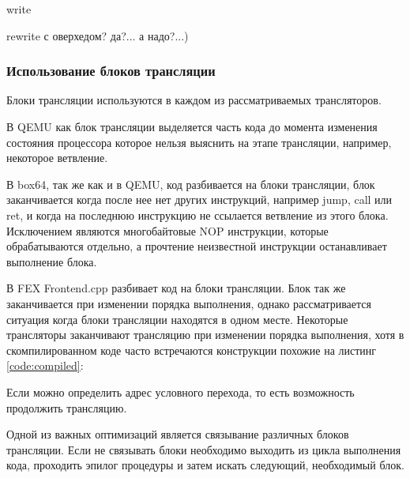write

rewrite с оверхедом? да?... а надо?...)

\subsubsection{Использование блоков трансляции}

Блоки трансляции используются в каждом из рассматриваемых трансляторов.

В QEMU как блок трансляции выделяется часть кода до момента изменения состояния процессора которое нельзя выяснить на этапе трансляции, например, некоторое ветвление. \cite{qemu_docs}

В box64, так же как и в QEMU, код разбивается на блоки трансляции, блок заканчивается когда после нее нет других инструкций, например jump, call или ret, и когда на последнюю инструкцию не ссылается ветвление из этого блока. Исключением являются многобайтовые NOP инструкции, которые обрабатываются отдельно, а прочтение неизвестной инструкции останавливает выполнение блока. \cite{box64_letter}

В FEX Frontend.cpp разбивает код на блоки трансляции. Блок так же заканчивается при изменении порядка выполнения, однако рассматривается ситуация когда блоки трансляции находятся в одном месте. Некоторые трансляторы заканчивают трансляцию при изменении порядка выполнения, хотя в скомпилированном коде часто встречаются конструкции похожие на листинг \ref{code:compiled}:


Если можно определить адрес условного перехода, то есть возможность продолжить трансляцию. \cite{fex_front}

Одной из важных оптимизаций является связывание различных блоков трансляции. Если не связывать блоки необходимо выходить из цикла выполнения кода, проходить эпилог процедуры и затем искать следующий, необходимый блок.

